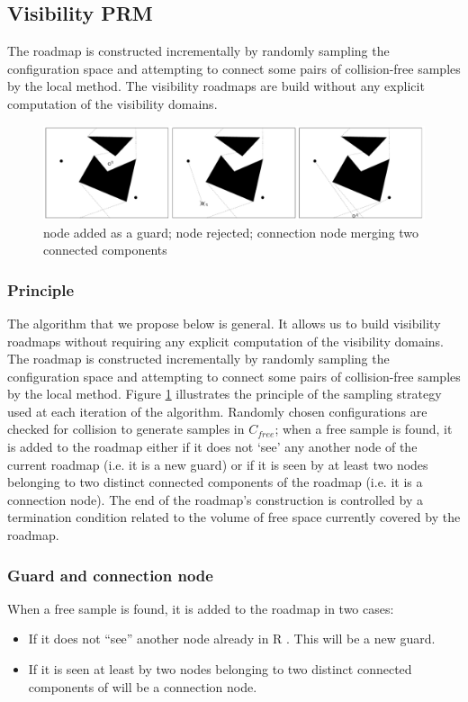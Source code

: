 \documentclass[11pt]{article}
\begin{document}
\subsection{Visibility PRM}
The roadmap is constructed incrementally by randomly sampling the configuration space and attempting to connect some pairs of collision-free samples by the local method.
The visibility roadmaps are build without any explicit computation of the visibility domains.
\begin{figure}[h]
\includegraphics[width=15cm]{visibility_prm_visual}
\centering
\caption{node added as a guard; node rejected; connection node merging two connected components}
\label{fig:visprm_visual}
\end{figure}

\subsubsection{Principle}
The algorithm that we propose below is general. It allows us to build visibility
roadmaps without requiring any explicit computation of the visibility domains.
The roadmap is constructed incrementally by randomly sampling the configuration
space and attempting to connect some pairs of collision-free samples by the
local method. Figure \ref{fig:visprm_visual} illustrates the principle of the sampling strategy used at
each iteration of the algorithm. Randomly chosen configurations are checked for
collision to generate samples in $C_{free}$; when a free sample is found, it is added to
the roadmap either if it does not ‘see’ any another node of the current roadmap (i.e.
it is a new guard) or if it is seen by at least two nodes belonging to two distinct
connected components of the roadmap (i.e. it is a connection node). The end of
the roadmap’s construction is controlled by a termination condition related to the
volume of free space currently covered by the roadmap.

\subsubsection{Guard and connection node}
When a free sample is found, it is added to the roadmap in two cases:
\begin{itemize}
\item If it does not “see” another node already in R . This will be a new guard.
\item If it is seen at least by two nodes belonging to two distinct connected components of will be a connection node.
\end{itemize}
\end{document}
